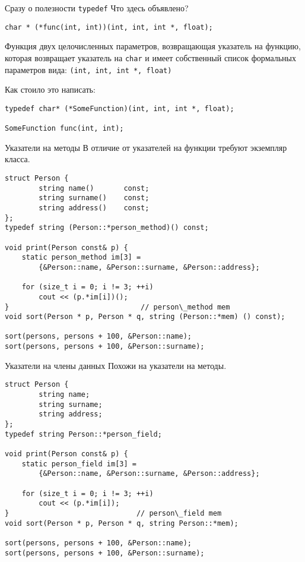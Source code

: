 \documentclass{beamer}
\begin{document}
\begin{frame}[fragile]{Сразу о полезности \texttt{typedef}}
Что здесь объявлено?
    \begin{lstlisting}
char * (*func(int, int))(int, int, int *, float);
    \end{lstlisting}
\pause

Функция двух целочисленных параметров, возвращающая указатель на функцию,
которая возвращает указатель на \texttt{char} и имеет собственный список
формальных параметров вида: \texttt{(int, int, int *, float)}

\medskip\pause

Как стоило это написать:
    \begin{lstlisting}
typedef char* (*SomeFunction)(int, int, int *, float);

SomeFunction func(int, int);
    \end{lstlisting}
\end{frame}

\begin{frame}[fragile]{Указатели на методы}
\small
В отличие от указателей на функции требуют экземпляр класса.
    \begin{lstlisting}
struct Person {
        string name()       const;
        string surname()    const;
        string address()    const;
};
typedef string (Person::*person_method)() const;

void print(Person const& p) {
    static person_method im[3] = 
        {&Person::name, &Person::surname, &Person::address};

    for (size_t i = 0; i != 3; ++i)
        cout << (p.*im[i])();
}                               // person\_method mem  
void sort(Person * p, Person * q, string (Person::*mem) () const);

sort(persons, persons + 100, &Person::name);   
sort(persons, persons + 100, &Person::surname);
    \end{lstlisting}
\end{frame}


\begin{frame}[fragile]{Указатели на члены данных}
\small
    Похожи на указатели на методы.
    \begin{lstlisting}
struct Person {
        string name;
        string surname;
        string address;
};
typedef string Person::*person_field;

void print(Person const& p) {
    static person_field im[3] = 
        {&Person::name, &Person::surname, &Person::address};

    for (size_t i = 0; i != 3; ++i)
        cout << (p.*im[i]);
}                              // person\_field mem
void sort(Person * p, Person * q, string Person::*mem);

sort(persons, persons + 100, &Person::name);   
sort(persons, persons + 100, &Person::surname);
    \end{lstlisting}
\end{frame}
\end{document}
